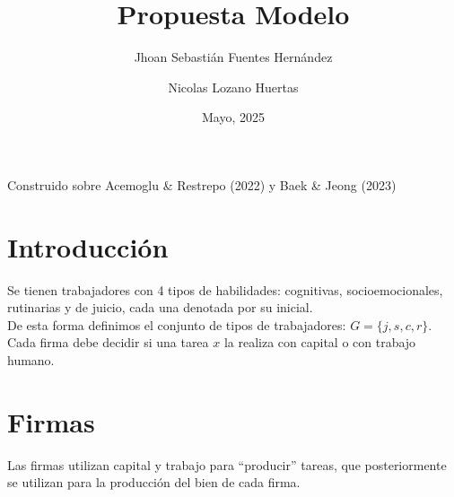 \documentclass{article}
\title{\textbf{Propuesta Modelo}}
\author{Jhoan Sebasti\'an Fuentes Hern\'andez \and Nicolas Lozano Huertas}
\date{Mayo, 2025}
\theoremstyle{remark}
\theoremstyle{definition}
\begin{document}
\maketitle

Construido sobre Acemoglu \& Restrepo (2022) y Baek \& Jeong (2023)

\section{Introducci\'on}
Se tienen trabajadores con 4 tipos de habilidades: cognitivas, socioemocionales, rutinarias y de juicio, cada una denotada por su inicial. \\
De esta forma definimos el conjunto de tipos de trabajadores: $G=\{j,s,c,r\}$.\\
Cada firma debe decidir si una tarea $x$ la realiza con capital o con trabajo humano.
\section{Firmas}

Las firmas utilizan capital y trabajo para ``producir'' tareas, que posteriormente se utilizan para la producci\'on del bien de cada firma.
\end{document}

